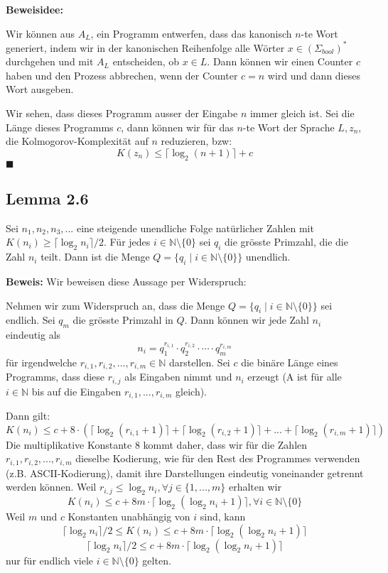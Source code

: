 \documentclass[a4paper, 11pt]{article}
\def\N{\mathbb{N}}
\begin{document}
    \textbf{Beweisidee: } 

    Wir können aus $A_L$, ein Programm entwerfen, dass das kanonisch $n$-te Wort generiert, indem wir in der kanonischen Reihenfolge alle Wörter $x \in (\Sigma_{bool})^*$ durchgehen und mit $A_L$ entscheiden, ob $x \in L$. Dann können wir einen Counter $c$ haben und den Prozess abbrechen, wenn der Counter $c = n$ wird und dann dieses Wort ausgeben.

    Wir sehen, dass dieses Programm ausser der Eingabe $n$ immer gleich ist. Sei die Länge dieses Programms $c$, dann können wir für das $n$-te Wort der Sprache $L, z_n,$ die Kolmogorov-Komplexität auf $n$ reduzieren, bzw:
    $$K(z_n) \leq \lceil \log_2(n+1)\rceil + c$$
    \hspace*{0pt}\hfill$\blacksquare$

    \subsection*{Lemma 2.6}
    Sei $n_1, n_2, n_3, ...$ eine steigende unendliche Folge natürlicher Zahlen mit $K(n_i) \geq \lceil \log_2 n_i \rceil / 2$. Für jedes $i \in \N \setminus \{0\}$ sei $q_i$ die grösste Primzahl, die die Zahl $n_i$ teilt. Dann ist die Menge $Q = \{q_i \mid i \in \N \setminus\{0\}\}$ unendlich.

    \textbf{Beweis: }
    Wir beweisen diese Aussage per Widerspruch:

    Nehmen wir zum Widerspruch an, dass die Menge $Q = \{q_i \mid i \in \N \setminus \{0\}\}$ sei endlich. Sei $q_m$ die grösste Primzahl in $Q$. Dann können wir jede Zahl $n_i$ eindeutig als 
    $$n_i = q_1^{r_{i, 1}} \cdot q_2^{r_{i,2}} \cdot \cdots \cdot q_m^{r_{i,m}}$$
    für irgendwelche $r_{i,1}, r_{i,2}, ..., r_{i,m} \in \N$ darstellen. Sei $c$ die binäre Länge eines Programms, dass diese $r_{i,j}$ als Eingaben nimmt und $n_i$ erzeugt (A ist für alle $i\in \N$ bis auf die Eingaben $r_{i,1}, ..., r_{i,m}$ gleich).
    
    Dann gilt:
    $$K(n_i) \leq c + 8 \cdot (\lceil \log_2(r_{i,1}+1)\rceil + \lceil \log_2(r_{i,2}+1)\rceil + ... + \lceil \log_2(r_{i,m}+1)\rceil)$$
    Die multiplikative Konstante $8$ kommt daher, dass wir für die Zahlen $r_{i,1}, r_{i,2}, ..., r_{i,m}$ dieselbe Kodierung, wie für den Rest des Programmes verwenden (z.B. ASCII-Kodierung), damit ihre Darstellungen eindeutig voneinander getrennt werden können. Weil  $r_{i,j} \leq \log_2 n_i, \forall j \in \{1, ..., m\}$ erhalten wir 
    $$K(n_i) \leq c + 8m \cdot \lceil \log_2(\log_2 n_i + 1)\rceil, \forall i \in \N \setminus \{0\}$$
    Weil $m$ und $c$ Konstanten unabhängig von $i$ sind, kann 
    $$\lceil \log_2 n_i \rceil / 2 \leq K(n_i) \leq c + 8m \cdot \lceil \log_2(\log_2 n_i + 1)\rceil$$
    $$\lceil \log_2 n_i \rceil/2 \leq c + 8m \cdot \lceil \log_2(\log_2 n_i + 1)\rceil$$
    nur für endlich viele $i \in \N \setminus \{0\}$ gelten. 
\end{document}
